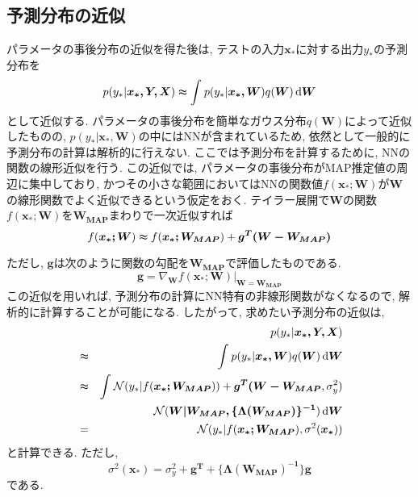 \documentclass[twocolumn]{jarticle}
\begin{document}
\subsection{予測分布の近似}
パラメータの事後分布の近似を得た後は, テストの入力${\bm {x_\ast}}$に対する出力${y_\ast}$の予測分布を
\begin{equation}
  p(y_\ast|\bm {x_\ast, Y, X}) \thickapprox \int_{}^{} p(y_\ast | \bm {x_\ast, W})q(\bm {W}) \,\mathrm{d}{\bm {W}}
\end{equation}
として近似する. パラメータの事後分布を簡単なガウス分布${q(\bm {W})}$によって近似したものの, ${p(y_\ast|\bm {x_\ast, W})}$の中にはNNが含まれているため, 依然として一般的に予測分布の計算は解析的に行えない. ここでは予測分布を計算するために, NNの関数の線形近似を行う. この近似では, パラメータの事後分布がMAP推定値の周辺に集中しており, かつその小さな範囲においてはNNの関数値${f(\bm {x_\ast;W})}$が${\bm {W}}$の線形関数でよく近似できるという仮定をおく. テイラー展開で${\bm {W}}$の関数${f(\bm {x_\ast;W})}$を${\bm {W_{MAP}}}$まわりで一次近似すれば
\begin{equation}
  f(\bm {x_\ast;W}) \thickapprox f(\bm {x_\ast;W_{MAP}}) + \bm {g^T(W - W_{MAP})}
\end{equation}

ただし, ${\bm {g}}$は次のように関数の勾配を${\bm {W_{MAP}}}$で評価したものである.
\begin{equation}
  \bm {g} = \nabla_{\bm {W}}f(\bm {x_\ast ; W})|_{\bm {W = W_{MAP}}}
\end{equation}
この近似を用いれば, 予測分布の計算にNN特有の非線形関数がなくなるので, 解析的に計算することが可能になる. したがって, 求めたい予測分布の近似は,
\begin{eqnarray}
  && p(y_\ast|\bm {x_\ast, Y, X}) \nonumber \\
  &\thickapprox& \int_{}^{} p(y_\ast|\bm {x_\ast, W})q(\bm {W}) \,\mathrm{d}{\bm {W}} \nonumber \\
  &\thickapprox& \int_{}^{} \mathcal{N} (y_\ast | f(\bm {x_\ast; W_{MAP}})) + \bm {g^T (W - W_{MAP}}, \sigma_y^2) \nonumber \\
  && \mathcal{N} (\bm {W|W_{MAP}, \{ \Lambda (\bm {W_{MAP}})\}^{-1}}) \,\mathrm{d}{\bm W} \nonumber \\
  &=& \mathcal{N} (y_\ast|f(\bm {x_\ast; W_{MAP}}), \sigma^2 (\bm {x_\ast}))
\end{eqnarray}
と計算できる. ただし,
\begin{equation}
  \sigma^2(\bm {x_\ast}) = \sigma_y^2 + \bm {g^T + \{\Lambda (W_{MAP})^{-1}\}g}
\end{equation}
である.
\end{document}
